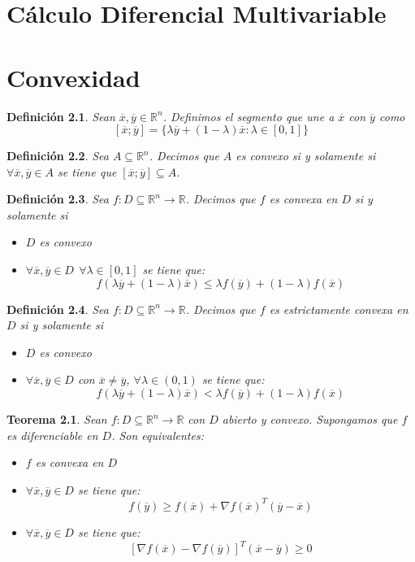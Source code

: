 \documentclass[11pt]{report}
\newtheorem{definition}{Definición}[section]
\newtheorem{theorem}{Teorema}[section]
\newcommand{\Rn}{\mathbb{R}^{n}}
\newcommand{\R}{\mathbb{R}}
\newcommand{\x}{\overline{x}}
\newcommand{\y}{\overline{y}}
\begin{document}
\chapter{Cálculo Diferencial Multivariable}
\chapter{Convexidad}
\begin{definition}
Sean $\x,\y\in\Rn$. Definimos el segmento que une a $\x$ con $\y$ como
$$[\x;\y] = \{\lambda\y + (1-\lambda)\x: \lambda\in [0,1]\}$$
\end{definition}

\begin{definition}
Sea $A\subseteq \mathbb{R}^{n}$. Decimos que $A$ es convexo si y solamente si $\forall\overline{x}, \overline{y}\in A$ se tiene que $[\overline{x}; \overline{y}]\subseteq A$.
\end{definition}

\begin{definition}
Sea $f:D\subseteq\Rn\rightarrow\R$. Decimos que $f$ es convexa en $D$ si y solamente si
\begin{itemize}
\item[(i)] $D$ es convexo
\item[(ii)] $\forall\x,\y\in D\ \ \forall\lambda\in [0, 1]$ se tiene que: $$f(\lambda\y+(1-\lambda)\x)\leq\lambda f(\y)+(1-\lambda)f(\x)$$
\end{itemize}
\end{definition}

\begin{definition}
Sea $f:D\subseteq\Rn\rightarrow\R$. Decimos que $f$ es estrictamente convexa en $D$ si y solamente si
\begin{itemize}
\item[(i)] $D$ es convexo
\item[(ii)] $\forall\x,\y\in D$ con $\x\ne\y$, $\forall\lambda\in (0, 1)$ se tiene que: $$f(\lambda\y+(1-\lambda)\x)<\lambda f(\y)+(1-\lambda)f(\x)$$
\end{itemize}
\end{definition}

\begin{theorem}
Sean $f:D\subseteq\Rn\rightarrow\R$ con $D$ abierto y convexo. Supongamos que $f$ es diferenciable en $D$. Son equivalentes:
\begin{itemize}
\item[(i)] $f$ es convexa en $D$
\item[(ii)] $\forall\x,\y\in D$ se tiene que: $$f(\y)\geq f(\x)+\nabla f(\x)^{T}(\y - \x)$$
\item[(iii)] $\forall\x,\y\in D$ se tiene que: $$[\nabla f(\x)-\nabla f(\y)]^{T}(\x-\y)\geq0$$
\end{itemize}
\end{theorem}
\end{document}
